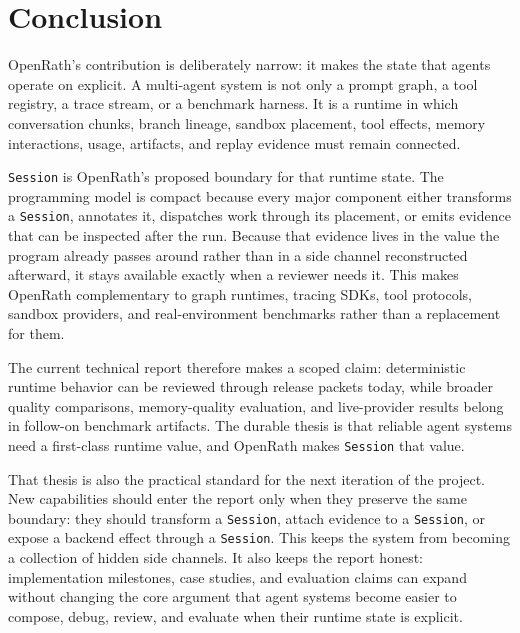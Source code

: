\documentclass{llmxive}
\begin{document}
\section{Conclusion}

OpenRath's contribution is deliberately narrow: it makes the state that agents
operate on explicit. A multi-agent system is not only a prompt graph, a tool
registry, a trace stream, or a benchmark harness. It is a runtime in which
conversation chunks, branch lineage, sandbox placement, tool effects, memory
interactions, usage, artifacts, and replay evidence must remain connected.

\texttt{Session} is OpenRath's proposed boundary for that runtime state. The
programming model is compact because every major component either transforms a
\texttt{Session}, annotates it, dispatches work through its placement, or emits
evidence that can be inspected after the run. Because that evidence lives in the
value the program already passes around rather than in a side channel
reconstructed afterward, it stays available exactly when a reviewer needs it.
This makes OpenRath complementary to graph runtimes, tracing SDKs, tool
protocols, sandbox providers, and real-environment benchmarks rather than a
replacement for them.

The current technical report therefore makes a scoped claim: deterministic
runtime behavior can be reviewed through release packets today, while broader
quality comparisons, memory-quality evaluation, and live-provider results
belong in follow-on benchmark artifacts. The durable thesis is that reliable
agent systems need a first-class runtime value, and OpenRath makes
\texttt{Session} that value.

That thesis is also the practical standard for the next iteration of the
project. New capabilities should enter the report only when they preserve the
same boundary: they should transform a \texttt{Session}, attach evidence to a
\texttt{Session}, or expose a backend effect through a \texttt{Session}. This
keeps the system from becoming a collection of hidden side channels. It also
keeps the report honest: implementation milestones, case studies, and
evaluation claims can expand without changing the core argument that agent
systems become easier to compose, debug, review, and evaluate when their
runtime state is explicit.
\end{document}

